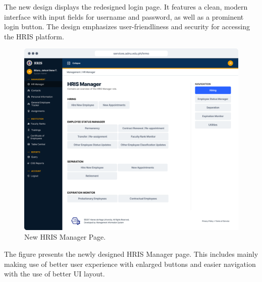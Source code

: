     The new design displays the redesigned login page. It features a clean, modern interface with input fields for username and password, as well as a prominent login button. The design emphasizes user-friendliness and security for accessing the HRIS platform.

    \begin{figure}[H]
        \centering
        \includegraphics[width=1\linewidth]{figures/app/manager.png}
        \caption{New HRIS Manager Page.}
        \label{fig:app-manager}
    \end{figure}

    The figure presents the newly designed HRIS Manager page. This includes mainly making use of better user experience with enlarged buttons and easier navigation with the use of better UI layout.

